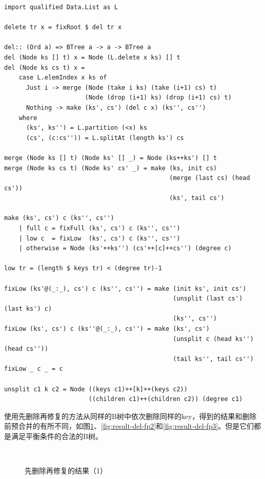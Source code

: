 \documentclass{ctexart}
\begin{document}
\lstset{language=Haskell}
\begin{lstlisting}[style=Haskell]
import qualified Data.List as L

delete tr x = fixRoot $ del tr x

del:: (Ord a) => BTree a -> a -> BTree a
del (Node ks [] t) x = Node (L.delete x ks) [] t
del (Node ks cs t) x =
    case L.elemIndex x ks of
      Just i -> merge (Node (take i ks) (take (i+1) cs) t)
                      (Node (drop (i+1) ks) (drop (i+1) cs) t)
      Nothing -> make (ks', cs') (del c x) (ks'', cs'')
    where
      (ks', ks'') = L.partition (<x) ks
      (cs', (c:cs'')) = L.splitAt (length ks') cs

merge (Node ks [] t) (Node ks' [] _) = Node (ks++ks') [] t
merge (Node ks cs t) (Node ks' cs' _) = make (ks, init cs)
                                             (merge (last cs) (head cs'))
                                             (ks', tail cs')

make (ks', cs') c (ks'', cs'')
    | full c = fixFull (ks', cs') c (ks'', cs'')
    | low c  = fixLow  (ks', cs') c (ks'', cs'')
    | otherwise = Node (ks'++ks'') (cs'++[c]++cs'') (degree c)

low tr = (length $ keys tr) < (degree tr)-1

fixLow (ks'@(_:_), cs') c (ks'', cs'') = make (init ks', init cs')
                                              (unsplit (last cs') (last ks') c)
                                              (ks'', cs'')
fixLow (ks', cs') c (ks''@(_:_), cs'') = make (ks', cs')
                                              (unsplit c (head ks'') (head cs''))
                                              (tail ks'', tail cs'')
fixLow _ c _ = c

unsplit c1 k c2 = Node ((keys c1)++[k]++(keys c2))
                       ((children c1)++(children c2)) (degree c1)
\end{lstlisting}

使用先删除再修复的方法从同样的B树中依次删除同样的key，得到的结果和删除前预合并的有所不同，如图\ref{fig:result-del-fp1}、\ref{fig:result-del-fp2}和\ref{fig:result-del-fp3}。但是它们都是满足平衡条件的合法的B树。

\begin{figure}[htbp]
  \centering
  \\
  \caption{先删除再修复的结果（1）} \label{fig:result-del-fp1}
\end{figure}
\end{document}
